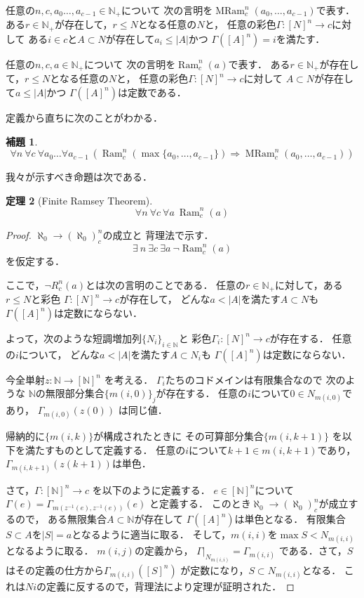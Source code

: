\documentclass[leqno, 12pt]{jsarticle}
\newtheorem{thm}{定理}
\newtheorem{lem}[thm]{補題}
\newcommand{\To}{\Longrightarrow}
\newcommand{\nn}{\mathbb{N}}
\DeclareMathOperator{\ram}{Ram}
\DeclareMathOperator{\mram}{MRam}
\begin{document}
任意の$n, c, a_0\dots, a_{c-1}\in \nn_+$について
次の言明を$\mram_c^n( a_0, \dots, a_{c-1})$で表す．
ある$r\in \nn_+$が存在して，$r\le N$となる任意の$N$と，
任意の彩色$\Gamma:[N]^n\to c$に対して
ある$i\in c$と$A\subset N$が存在して$a_i\le |A|$かつ
$\Gamma([A]^n)=i$を満たす．


任意の$n, c, a\in \nn_+$について
次の言明を$\ram_{c}^n(a)$で表す．
ある$r\in \nn_+$が存在して，$r\le N$となる任意の$N$と，
任意の彩色$\Gamma:[N]^n\to c$に対して
$A\subset N$が存在して$a\le |A|$かつ
$\Gamma([A]^n)$は定数である．


定義から直ちに次のことがわかる．
\begin{lem}
\[
\forall n\  \forall c\ \forall a_0\dots \forall a_{c-1}\ 
(\ram_{c}^n(\max\{a_0, \dots, a_{c-1}\})\To \mram_{c}^n(a_0, \dots, a_{c-1}))
\]
\end{lem}

我々が示すべき命題は次である．

\begin{thm}[Finite Ramsey Theorem]
\[
\forall n\  \forall c\ \forall a\ \ram_c^n(a)
\]
\end{thm}
\begin{proof}
$\aleph_0\to (\aleph_0)_c^n$の成立と
背理法で示す．
\[
\exists\ n\ \exists c\ \exists a\ \lnot \ram_c^n(a)
\]
を仮定する．

ここで，$\lnot R_c^n(a)$とは次の言明のことである．
任意の$r\in \nn_+$に対して，ある$r\le N$と彩色
$\Gamma:[N]^n\to c$が存在して，
どんな$a<|A|$を満たす$A\subset N$も
$\Gamma([A]^n)$は定数にならない．

よって，次のような短調増加列$\{N_i\}_{i\in \nn}$と
彩色$\Gamma_i:[N]^n\to c$が存在する．
任意の$i$について，
どんな$a<|A|$を満たす$A\subset N_i$も
$\Gamma([A]^n)$は定数にならない．

今全単射$z:\nn\to [\nn]^n$
を考える．
$\Gamma_i$たちのコドメインは有限集合なので
次のような
$\nn$の無限部分集合$\{m(i, 0)\}_j$が存在する．
任意の$i$について$0\in N_{m(i,0)}$であり，
$\Gamma_{m(i, 0)}(z(0))$
は同じ値．

帰納的に$\{m(i, k)\}$が構成されたときに
その可算部分集合$\{m(i, k+1)\}$
を以下を満たすものとして定義する．
任意の$i$について$k+1\in m(i, k+1)$であり，
$\Gamma_{m(i, k+1)}(z(k+1))$は単色．

さて，$\Gamma:[\nn]^n\to c$
を以下のように定義する．
$e\in [\nn]^n$について
$\Gamma(e)=\Gamma_{m(z^{-1}(e),z^{-1}(e))}(e)$
と定義する．
このとき$\aleph_0\to (\aleph_0)_c^n$が成立するので，
ある無限集合$A\subset \nn$が存在して
$\Gamma([A]^n)$は単色となる．
有限集合$S\subset A$を$|S|=a$となるように適当に取る．
そして，$m(i, i)$を$\max S< N_{m(i,i)}$となるように取る．
$m(i, j)$の定義から，
$\Gamma|_{N_{m(i,i)}}=\Gamma_{m(i, i)}$
である．さて，$S$はその定義の仕方から$\Gamma_{m(i,i)}([S]^n)$
が定数になり，$S\subset N_{m(i,i)}$となる．
これは$Ni$の定義に反するので，背理法により定理が証明された．
\end{proof}
\end{document}
